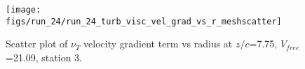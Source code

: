 \begin{figure}[H]
\centering
\texttt{[image: figs/run\_24/run\_24\_turb\_visc\_vel\_grad\_vs\_r\_meshscatter]}
\caption{Scatter plot of $\nu_T$ velocity gradient term vs radius at $z/c$=7.75, $V_{free}$=21.09, station 3.}
\label{fig:run_24_turb_visc_vel_grad_vs_r_meshscatter}
\end{figure}


